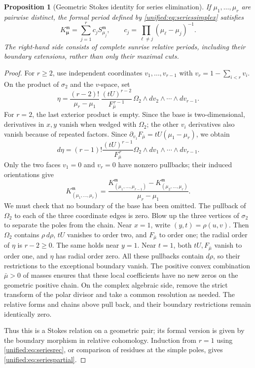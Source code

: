 \documentclass[11pt,a4paper,oneside]{article}
\theoremstyle{plain}
\newtheorem{proposition}[theorem]{Proposition}
\theoremstyle{definition}
\theoremstyle{remark}
\numberwithin{equation}{section}
\begin{document}
\begin{proposition}[Geometric Stokes identity for series elimination]\label{unified:prop:seriesstokes}
If $\mu_1,\ldots,\mu_r$ are pairwise distinct, the formal period defined by \eqref{unified:eq:seriessimplex} satisfies
\begin{equation}\label{unified:eq:seriespartial}
 K_{\boldsymbol\mu}^{\mathfrak m}
 =\sum_{j=1}^r c_jS_{\mu_j}^{\mathfrak m},
 \qquad c_j=\prod_{\ell\ne j}(\mu_\ell-\mu_j)^{-1}.
\end{equation}
The right-hand side consists of complete sunrise relative periods, including their boundary extensions, rather than only their maximal cuts.
\end{proposition}
\begin{proof}
For $r\ge2$, use independent coordinates $v_1,\ldots,v_{r-1}$ with $v_r=1-\sum_{i<r}v_i$.
On the product of $\sigma_2$ and the $v$-space, set
\[
 \eta=\frac{(r-2)!}{\mu_r-\mu_1}\,
 \frac{(tU)^{r-2}}{F_{\bar\mu}^{\,r-1}}\,
 \Omega_2\wedge dv_2\wedge\cdots\wedge dv_{r-1}.
\]
For $r=2$, the last exterior product is empty. Since the base is two-dimensional, derivatives in $x,y$ vanish when wedged with $\Omega_2$;
the other $v_i$ derivatives also vanish because of repeated factors.
Since $\partial_{v_1}F_{\bar\mu}=tU(\mu_1-\mu_r)$, we obtain
\[
 d\eta=(r-1)!\frac{(tU)^{r-1}}{F_{\bar\mu}^{\,r}}
       \Omega_2\wedge dv_1\wedge\cdots\wedge dv_{r-1}.
\]
Only the two faces $v_1=0$ and $v_r=0$ have nonzero pullbacks; their induced orientations give
\begin{equation}\label{unified:eq:seriesrec}
 K_{(\mu_1,\ldots,\mu_r)}^{\mathfrak m}
 =\frac{K_{(\mu_1,\ldots,\mu_{r-1})}^{\mathfrak m}
        -K_{(\mu_2,\ldots,\mu_r)}^{\mathfrak m}}
       {\mu_r-\mu_1}.
\end{equation}
We must check that no boundary of the base has been omitted. The pullback of $\Omega_2$ to each of the three coordinate edges is zero.
Blow up the three vertices of $\sigma_2$ to separate the poles from the chain.
Near $x=1$, write $(y,t)=\rho(u,v)$. Then
$\Omega_2$ contains $\rho\,d\rho$, $tU$ vanishes to order two, and $F_{\bar\mu}$ to order one;
the radial order of $\eta$ is $r-2\ge0$.
The same holds near $y=1$. Near $t=1$, both $tU,F_{\bar\mu}$ vanish to order one,
and $\eta$ has radial order zero. All these pullbacks contain $d\rho$,
so their restrictions to the exceptional boundary vanish.
The positive convex combination $\bar\mu>0$ of masses ensures that these local coefficients have no new zeros on the geometric positive chain.
On the complex algebraic side, remove the strict transform of the polar divisor and take a common resolution as needed.
The relative forms and chains above pull back, and their boundary restrictions remain identically zero.

Thus this is a Stokes relation on a geometric pair; its formal version is given by the boundary morphism in relative cohomology.
Induction from $r=1$ using \eqref{unified:eq:seriesrec}, or comparison of residues at the simple poles,
gives \eqref{unified:eq:seriespartial}.
\end{proof}
\end{document}
